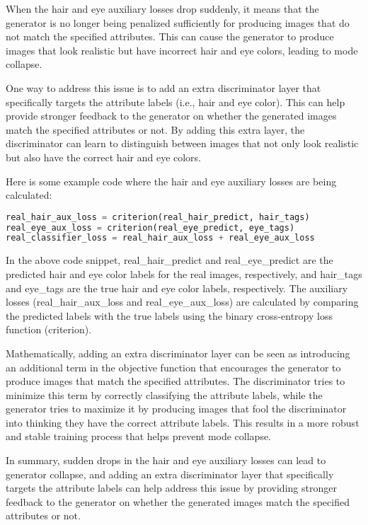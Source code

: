 \documentclass{article}
\theoremstyle{mytheoremstyle}
\theoremstyle{mytheoremstyle}
\theoremstyle{myproblemstyle}
\begin{document}
When the hair and eye auxiliary losses drop suddenly, it means that the generator is no longer being penalized sufficiently for producing images that do not match the specified attributes. This can cause the generator to produce images that look realistic but have incorrect hair and eye colors, leading to mode collapse.

One way to address this issue is to add an extra discriminator layer that specifically targets the attribute labels (i.e., hair and eye color). This can help provide stronger feedback to the generator on whether the generated images match the specified attributes or not. By adding this extra layer, the discriminator can learn to distinguish between images that not only look realistic but also have the correct hair and eye colors.

Here is some example code where the hair and eye auxiliary losses are being calculated:

\begin{lstlisting}[language=Python]
real_hair_aux_loss = criterion(real_hair_predict, hair_tags)
real_eye_aux_loss = criterion(real_eye_predict, eye_tags)
real_classifier_loss = real_hair_aux_loss + real_eye_aux_loss
\end{lstlisting}


In the above code snippet, real\_hair\_predict and real\_eye\_predict are the predicted hair and eye color labels for the real images, respectively, and hair\_tags and eye\_tags are the true hair and eye color labels, respectively. The auxiliary losses (real\_hair\_aux\_loss and real\_eye\_aux\_loss) are calculated by comparing the predicted labels with the true labels using the binary cross-entropy loss function (criterion).


Mathematically, adding an extra discriminator layer can be seen as introducing an additional term in the objective function that encourages the generator to produce images that match the specified attributes. The discriminator tries to minimize this term by correctly classifying the attribute labels, while the generator tries to maximize it by producing images that fool the discriminator into thinking they have the correct attribute labels. This results in a more robust and stable training process that helps prevent mode collapse.

In summary, sudden drops in the hair and eye auxiliary losses can lead to generator collapse, and adding an extra discriminator layer that specifically targets the attribute labels can help address this issue by providing stronger feedback to the generator on whether the generated images match the specified attributes or not.
\end{document}
